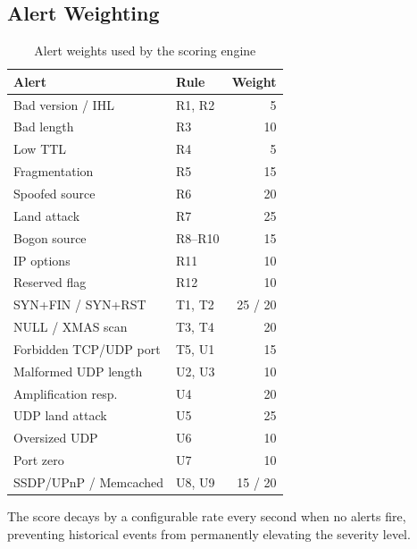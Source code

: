 \subsection{Alert Weighting}

\begin{table}[H]
	\centering
	\caption{Alert weights used by the scoring engine}
	\begin{tabular}{llr}
		\toprule
		\textbf{Alert} & \textbf{Rule} & \textbf{Weight} \\
		\midrule
		Bad version / IHL       & R1, R2   & 5  \\
		Bad length              & R3       & 10 \\
		Low TTL                 & R4       & 5  \\
		Fragmentation           & R5       & 15 \\
		Spoofed source          & R6       & 20 \\
		Land attack             & R7       & 25 \\
		Bogon source            & R8--R10  & 15 \\
		IP options              & R11      & 10 \\
		Reserved flag           & R12      & 10 \\
		SYN+FIN / SYN+RST       & T1, T2   & 25 / 20 \\
		NULL / XMAS scan        & T3, T4   & 20 \\
		Forbidden TCP/UDP port  & T5, U1   & 15 \\
		Malformed UDP length    & U2, U3   & 10 \\
		Amplification resp.     & U4       & 20 \\
		UDP land attack         & U5       & 25 \\
		Oversized UDP           & U6       & 10 \\
		Port zero               & U7       & 10 \\
		SSDP/UPnP / Memcached   & U8, U9   & 15 / 20 \\
		\bottomrule
	\end{tabular}
	\label{tab:weights}
\end{table}

The score decays by a configurable rate every second when no alerts fire, preventing historical events from permanently elevating the severity level.